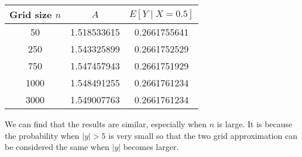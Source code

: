 \documentclass[]{article}
\begin{document}
\begin{longtable}[]{@{}ccc@{}}
\toprule
Grid size \(n\) & \(A\) & \(E[Y\mid X=0.5]\)\tabularnewline
\midrule
\endhead
50 & 1.518533615 & 0.2661755641\tabularnewline
250 & 1.543325899 & 0.2661752529\tabularnewline
750 & 1.547457943 & 0.2661751929\tabularnewline
1000 & 1.548491255 & 0.2661761234\tabularnewline
3000 & 1.549007763 & 0.2661761234\tabularnewline
\bottomrule
\end{longtable}

We can find that the results are similar, especially when $n$ is large. It is because the probability when $|y|>5$ is very small so that the two grid approximation can be considered the same when $|y|$ becomes larger.
\end{document}
